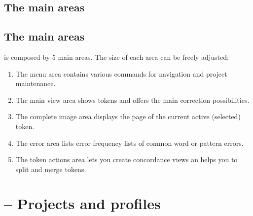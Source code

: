 \subsection{The main areas}
\begin{frame}
\end{frame}

\subsection{The main areas}
\begin{frame}
	\pocoto{} is composed by 5 main areas. The size of each area can be
	freely adjusted:
	\begin{enumerate}
		\item The menu area contains various commands for navigation and project
			maintenance.
		\item The main view area shows tokens and offers the main correction
			possibilities.
		\item The complete image area displays the page of the current active
			(selected) token.
		\item The error area lists error frequency lists of common word or
			pattern errors.
		\item The token actions area lets you create concordance views an helps
			you to split and merge tokens.
	\end{enumerate}
\end{frame}

\section{\pocoto{} -- Projects and profiles}
